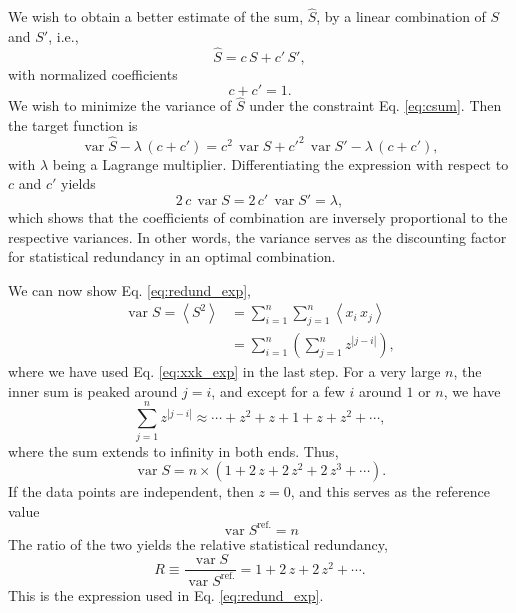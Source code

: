 \documentclass[12pt]{article}
\begin{document}
We wish to obtain a better estimate of the sum, $\hat S$,
by a linear combination of $S$ and $S'$, i.e.,
\begin{equation}
  \hat S
  =
  c \, S + c' \, S',
\end{equation}
%
with normalized coefficients
%
\begin{equation}
  c + c' = 1.
  \label{eq:csum}
\end{equation}
%
We wish to minimize the variance of $\hat S$ under the constraint
Eq. \eqref{eq:csum}.  Then the target function is
$$
\operatorname{var} \hat S - \lambda \, (c + c')
=
c^2 \, \operatorname{var} S
+
c'^2 \, \operatorname{var} S'
-
\lambda \, (c + c'),
$$
with $\lambda$ being a Lagrange multiplier.
%
Differentiating the expression with respect to $c$ and $c'$ yields
$$
2 \, c \, \operatorname{var} S
=
2 \, c' \, \operatorname{var} S'
=
\lambda,
$$
which shows that the coefficients of combination 
are inversely proportional to the respective variances.
%
In other words, the variance serves as the discounting factor
for statistical redundancy in an optimal combination.

We can now show Eq. \eqref{eq:redund_exp},
%
$$
\begin{aligned}
\operatorname{var} S
=
\left\langle S^2 \right\rangle
&=
\sum_{i = 1}^n
  \sum_{j = 1}^n
    \left\langle x_i \, x_j \right\rangle
\\
&=
\sum_{i = 1}^n
\left(
\sum_{j = 1}^n
z^{ | j - i | }
\right),
\end{aligned}
$$
%
where we have used Eq. \eqref{eq:xxk_exp}
in the last step.
%
For a very large $n$,
the inner sum is peaked around $j = i$,
and except for a few $i$ around $1$ or $n$,
we have
$$
\sum_{j = 1}^n z^{ | j - i | }
\approx
\cdots + z^2 + z + 1 + z + z^2 + \cdots,
$$
where the sum extends to infinity in both ends.
%
Thus,
\begin{equation}
  \operatorname{var} S
  =
  n \times ( 1 + 2 \, z + 2 \, z^2 + 2 \, z^3 + \cdots ).
  \label{eq:varS}
\end{equation}
If the data points are independent, then $z = 0$,
and this serves as the reference value
\begin{equation}
  \operatorname{var} S^\mathrm{ref.}
  =
  n
\end{equation}
%
The ratio of the two yields the relative statistical redundancy,
$$
R \equiv
\frac{ \operatorname{var} S }
     { \operatorname{var} S^{ \mathrm{ref.} } }
=
1 + 2 \, z + 2 \, z^2 + \cdots.
$$
This is the expression used in Eq. \eqref{eq:redund_exp}.
\end{document}
